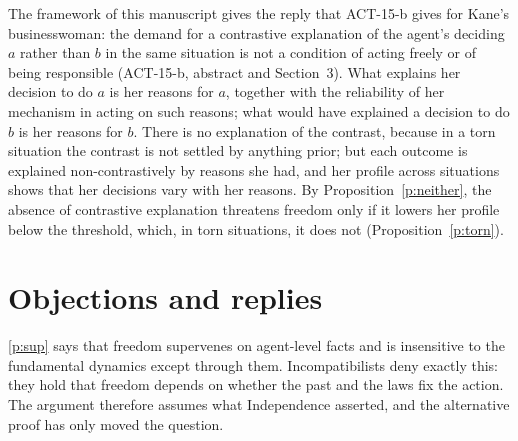 \documentclass{situationist-preprint}
\begin{document}
The framework of this manuscript gives the reply that ACT-15-b gives for Kane's businesswoman: the demand for a contrastive explanation of the agent's deciding $a$ rather than $b$ in the same situation is not a condition of acting freely or of being responsible (ACT-15-b, abstract and Section~3). What explains her decision to do $a$ is her reasons for $a$, together with the reliability of her mechanism in acting on such reasons; what would have explained a decision to do $b$ is her reasons for $b$. There is no explanation of the contrast, because in a torn situation the contrast is not settled by anything prior; but each outcome is explained non-contrastively by reasons she had, and her profile across situations shows that her decisions vary with her reasons. By Proposition~\ref{p:neither}, the absence of contrastive explanation threatens freedom only if it lowers her profile below the threshold, which, in torn situations, it does not (Proposition~\ref{p:torn}).

\section{Objections and replies}\label{s:obj}

\begin{objection}\label{o:beg}
\ref{p:sup} says that freedom supervenes on agent-level facts and is insensitive to the fundamental dynamics except through them. Incompatibilists deny exactly this: they hold that freedom depends on whether the past and the laws fix the action. The argument therefore assumes what Independence asserted, and the alternative proof has only moved the question.
\end{objection}
\end{document}
